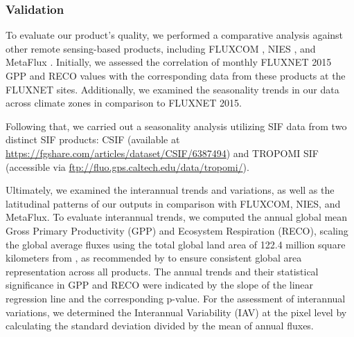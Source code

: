 \subsubsection*{Validation}
To evaluate our product's quality, we performed a comparative analysis against other remote sensing-based products, including FLUXCOM \citep{jung2019fluxcom}, NIES \citep{zeng2020global}, and MetaFlux \citep{nathaniel2023metaflux}. Initially, we assessed the correlation of monthly FLUXNET 2015 GPP and RECO values with the corresponding data from these products at the FLUXNET sites. Additionally, we examined the seasonality trends in our data across climate zones in comparison to FLUXNET 2015. \par

Following that, we carried out a seasonality analysis utilizing SIF data from two distinct SIF products: CSIF \citep{zhang2018global} (available at \url{https://fgshare.com/articles/dataset/CSIF/6387494}) and TROPOMI SIF \citep{kohler2018global} (accessible via \url{ftp://fluo.gps.caltech.edu/data/tropomi/}).\par

Ultimately, we examined the interannual trends and variations, as well as the latitudinal patterns of our outputs in comparison with FLUXCOM, NIES, and MetaFlux. To evaluate interannual trends, we computed the annual global mean Gross Primary Productivity (GPP) and Ecosystem Respiration (RECO), scaling the global average fluxes using the total global land area of 122.4 million square kilometers from \citep{friedl2010modis}, as recommended by \citep{jung2020scaling} to ensure consistent global area representation across all products. The annual trends and their statistical significance in GPP and RECO were indicated by the slope of the linear regression line and the corresponding p-value. For the assessment of interannual variations, we determined the Interannual Variability (IAV) at the pixel level by calculating the standard deviation divided by the mean of annual fluxes.\par

